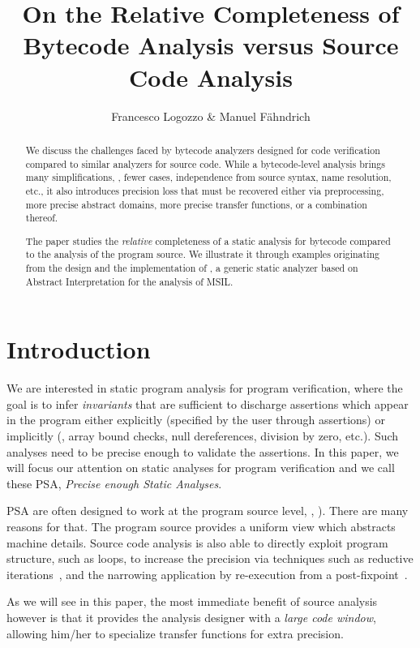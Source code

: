 \documentclass{llncs}
\title{On the Relative Completeness of Bytecode Analysis versus Source Code Analysis}
\author{Francesco Logozzo \& Manuel F\"ahndrich}
\institute{Microsoft Research\\
\email{\{logozzo,maf\}@microsoft.com} }
\begin{document}
\pagestyle{plain}

\maketitle

\begin{abstract}
We discuss the challenges faced by bytecode analyzers designed for
code verification compared to similar analyzers for source code.
While a bytecode-level analysis brings many simplifications, \eg,
fewer cases, independence from source syntax, name resolution, etc.,
it also introduces precision loss that must be recovered either via
preprocessing, more precise abstract domains, more precise
transfer functions, or a combination thereof.

The paper studies the \emph{relative} completeness of a static
analysis for bytecode compared to the analysis of the program
source.  We illustrate it through examples originating from the
design and the implementation of \Clousot{}, a generic static analyzer
based on Abstract Interpretation for the analysis of MSIL.
\end{abstract}

\section{Introduction}
We are interested in static program analysis for program verification,
where the goal is to infer \emph{invariants} that are
sufficient to discharge assertions which appear in the program either explicitly
(specified by the user through assertions) or implicitly
(\eg, array bound checks, null dereferences, division by zero,
etc.). Such analyses need to be precise enough to validate
the assertions.  In this paper, we will focus our attention on static
analyses for program verification and we call these PSA,
\emph{Precise enough Static Analyses}.

PSA are often designed to work at the program source level, \eg,
\cite{BlanchetCousotEtAl03,TVLA,Logozzo07,Bourdoncle93,Airac5}).
There are many reasons for that.  The program source provides a
uniform view which abstracts machine details.
Source code analysis is also able to directly exploit program
structure, such as loops, to increase the precision via techniques such
as reductive iterations~\cite{Granger92}, and the narrowing application by
re-execution from a post-fixpoint~\cite{CousotCousot77}. 

As we will see in this paper, the most immediate benefit of source
analysis however is that it provides the analysis designer with a
\emph{large code window}, allowing him/her to specialize transfer
functions for extra precision.
\end{document}
